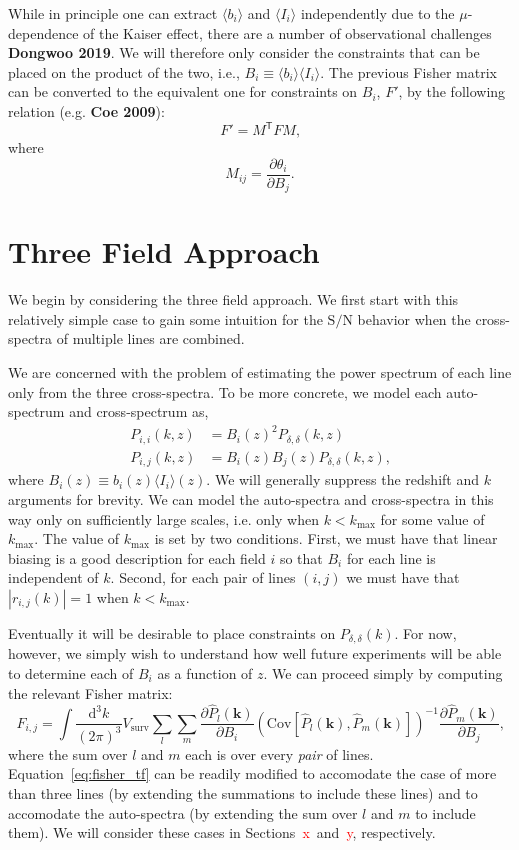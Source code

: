\documentclass{aastex62}
\newcommand{\Gus}[1]{\textcolor{red}{#1}}
\newcommand{\abs}[1]{\left| #1 \right|}
\newcommand{\beq}{\begin{equation}}
\newcommand{\eeq}{\end{equation}}
\newcommand{\ps}[1]{\ensuremath{P_{#1,#1}}}
\newcommand{\xps}[2]{\ensuremath{P_{#1,#2}}}
\newcommand{\kmax}{\ensuremath{k_{\text{max}}}}
\newcommand{\denps}{\ensuremath{P_{\delta,\delta}}}
\newcommand{\Cov}[2]{\mathrm{Cov}[#1,#2]}
\newcommand{\avg}[1]{\ensuremath{\langle #1 \rangle}}
\newcommand{\SN}{\ensuremath{\text{S}/\text{N}}}
\newcommand{\bi}{\ensuremath{\avg{b_i}}}
\newcommand{\Ii}{\ensuremath{\avg{I_i}}}
\begin{document}
While in principle one can extract $\bi$ and $\Ii$ independently due to the
$\mu$-dependence of the Kaiser effect, there are a number of observational
challenges {\bf Dongwoo 2019}. We will therefore only consider the constraints
that can be placed on the product of the two, i.e., $B_i \equiv \bi \Ii$. The
previous Fisher matrix can be converted to the equivalent one for constraints
on $B_i$, $F'$, by the following relation (e.g. {\bf Coe 2009}):
\beq\label{eq:fisher_transform}
F' = M^{\mathsf{T}} F M\text{,}
\eeq
where
\beq\label{eq:trans_matrix}
M_{ij} = \frac{\partial \theta_i}{\partial B_j}\text{.}
\eeq

\section{Three Field Approach}\label{sec:tf}
We begin by considering the three field approach. We first start with this
relatively simple case to gain some intuition for the \SN{} behavior when the
cross-spectra of multiple lines are combined.

We are concerned with the problem of estimating the power spectrum of each
line only from the three cross-spectra. To be more concrete, we model each
auto-spectrum and cross-spectrum as,
\beq\label{eq:auto_xps}
\begin{split}
\ps{i}(k,z) &= B_i(z)^2 \denps(k,z) \\
\xps{i}{j}(k,z) &= B_i(z) B_j(z) \denps(k,z)\text{,}
\end{split}
\eeq
where $B_i(z) \equiv b_i(z) \avg{I_i}(z)$. We will generally suppress the
redshift and $k$ arguments for brevity. We can model the auto-spectra and
cross-spectra in this way only on sufficiently large scales, i.e. only when
$k<\kmax$ for some value of \kmax{}. The value of \kmax{} is set by two
conditions. First, we must have that linear biasing is a good description for
each field $i$ so that $B_i$ for each line is independent of $k$. Second, for
each pair of lines $(i,j)$ we must have that $\abs{r_{i,j}(k)} = 1$ when
$k<\kmax$.

Eventually it will be desirable to place constraints on $\denps(k)$. For now,
however, we simply wish to understand how well future experiments will be able
to determine each of $B_i$ as a function of $z$. We can proceed simply by
computing the relevant Fisher matrix:
\beq\label{eq:fisher_tf}
F_{i,j} = 
\int \frac{\text{d}^3k}{(2\pi)^3} V_{\text{surv}}
\sum_{l} \sum_{m}
\frac{\partial \hat{P}_{l}(\bm{k})}{\partial B_i}
\left(\Cov{\hat{P}_{l}(\bm{k})}{\hat{P}_{m}(\bm{k})}\right)^{-1}
\frac{\partial \hat{P}_{m}(\bm{k})}{\partial B_j}\text{,}
\eeq
where the sum over $l$ and $m$ each is over every \emph{pair} of lines.
Equation~\ref{eq:fisher_tf} can be readily modified to accomodate the case of
more than three lines (by extending the summations to include these lines) and
to accomodate the auto-spectra (by extending the sum over $l$ and $m$ to
include them). We will consider these cases in Sections~\Gus{x}~and~\Gus{y},
respectively.
\end{document}
